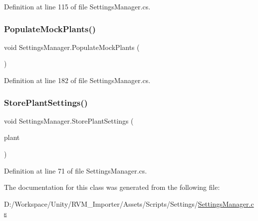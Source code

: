 Definition at line 115 of file Settings\+Manager.\+cs.

\mbox{\label{class_settings_manager_a45c71b583356ab8c268a4c9b4b1b8f8c}} 
\subsubsection{\texorpdfstring{PopulateMockPlants()}{PopulateMockPlants()}}
{\footnotesize\ttfamily void Settings\+Manager.\+Populate\+Mock\+Plants (\begin{DoxyParamCaption}{ }\end{DoxyParamCaption})}



Definition at line 182 of file Settings\+Manager.\+cs.

\mbox{\label{class_settings_manager_aeb3638844b2eee2c901a9e4bb4970697}} 
\subsubsection{\texorpdfstring{StorePlantSettings()}{StorePlantSettings()}}
{\footnotesize\ttfamily void Settings\+Manager.\+Store\+Plant\+Settings (\begin{DoxyParamCaption}\item[{\mbox{\hyperlink{class_plant_settings}{Plant\+Settings}}}]{plant }\end{DoxyParamCaption})}



Definition at line 71 of file Settings\+Manager.\+cs.



The documentation for this class was generated from the following file\+:\begin{DoxyCompactItemize}
\item 
D\+:/\+Workspace/\+Unity/\+R\+V\+M\+\_\+\+Importer/\+Assets/\+Scripts/\+Settings/\mbox{\hyperlink{_settings_manager_8cs}{Settings\+Manager.\+cs}}\end{DoxyCompactItemize}
